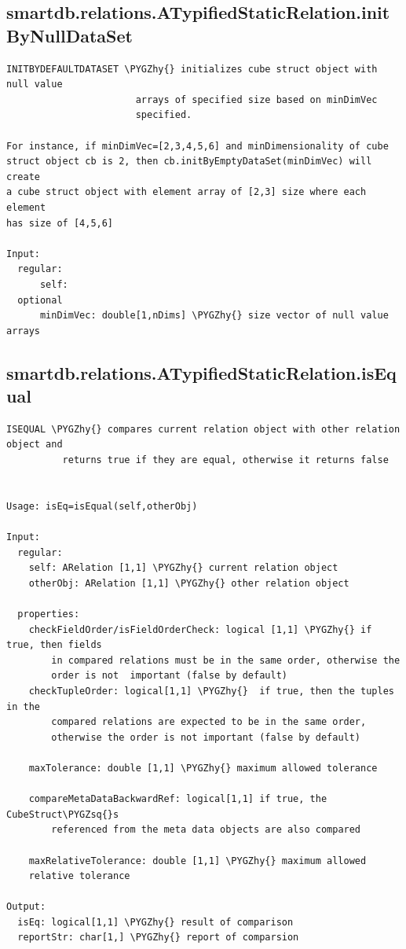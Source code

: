 \documentclass[letterpaper,10pt,english]{sphinxmanual}
\def\PYGZhy{\char`\-}
\def\PYGZsq{\char`\'}
\begin{document}
\subsection{smartdb.relations.ATypifiedStaticRelation.initByNullDataSet}
\label{chap_functions:smartdb-relations-atypifiedstaticrelation-initbynulldataset}
\begin{Verbatim}[commandchars=\\\{\}]
INITBYDEFAULTDATASET \PYGZhy{} initializes cube struct object with null value
                       arrays of specified size based on minDimVec
                       specified.

For instance, if minDimVec=[2,3,4,5,6] and minDimensionality of cube
struct object cb is 2, then cb.initByEmptyDataSet(minDimVec) will create
a cube struct object with element array of [2,3] size where each element
has size of [4,5,6]

Input:
  regular:
      self:
  optional
      minDimVec: double[1,nDims] \PYGZhy{} size vector of null value arrays
\end{Verbatim}


\subsection{smartdb.relations.ATypifiedStaticRelation.isEqual}
\label{chap_functions:smartdb-relations-atypifiedstaticrelation-isequal}
\begin{Verbatim}[commandchars=\\\{\}]
ISEQUAL \PYGZhy{} compares current relation object with other relation object and
          returns true if they are equal, otherwise it returns false


Usage: isEq=isEqual(self,otherObj)

Input:
  regular:
    self: ARelation [1,1] \PYGZhy{} current relation object
    otherObj: ARelation [1,1] \PYGZhy{} other relation object

  properties:
    checkFieldOrder/isFieldOrderCheck: logical [1,1] \PYGZhy{} if true, then fields
        in compared relations must be in the same order, otherwise the
        order is not  important (false by default)
    checkTupleOrder: logical[1,1] \PYGZhy{}  if true, then the tuples in the
        compared relations are expected to be in the same order,
        otherwise the order is not important (false by default)

    maxTolerance: double [1,1] \PYGZhy{} maximum allowed tolerance

    compareMetaDataBackwardRef: logical[1,1] if true, the CubeStruct\PYGZsq{}s
        referenced from the meta data objects are also compared

    maxRelativeTolerance: double [1,1] \PYGZhy{} maximum allowed
    relative tolerance

Output:
  isEq: logical[1,1] \PYGZhy{} result of comparison
  reportStr: char[1,] \PYGZhy{} report of comparsion
\end{Verbatim}
\end{document}
